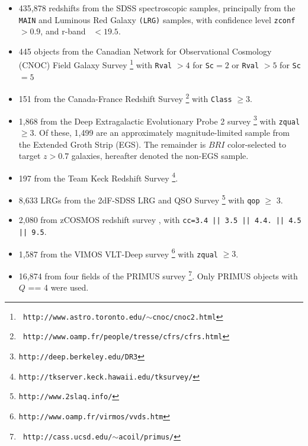 \documentclass[preprint]{aastex}
\begin{document}
\begin{itemize} 

    \item 435,878 redshifts from the SDSS spectroscopic samples,
principally from the \texttt{MAIN} and Luminous Red Galaxy \texttt{(LRG)}
samples, with confidence level \texttt{zconf}$ > 0.9$, and r-band
\cmodelmag\ $ <19.5$.


    \item 445 objects from the Canadian Network for Observational
Cosmology (CNOC) Field Galaxy Survey \cite[CNOC2;][]{yee00}\footnote{\tt
http://www.astro.toronto.edu/$\sim$cnoc/cnoc2.html} with \texttt{Rval} $>4$
for \texttt{Sc}$=2$ or \texttt{Rval} $> 5$ for \texttt{Sc}$=5$

    \item 151 from the Canada-France Redshift
Survey \cite[CFRS;][]{lilly95}\footnote{\tt
http://www.oamp.fr/people/tresse/cfrs/cfrs.html} with \texttt{Class} $\geq 3$.

    \item 1,868 from the Deep Extragalactic Evolutionary Probe 2 survey
\citep[DEEP2;][]{weiner05}\footnote{\tt http://deep.berkeley.edu/DR3}
with \texttt{zqual} $\geq 3$. 
Of these, 1,499 are an approximately magnitude-limited sample from the Extended Groth Strip (EGS).
The remainder is $BRI$ color-selected to target $z>0.7$ galaxies, hereafter denoted the non-EGS sample. 

    \item 197 from the Team Keck Redshift Survey \cite[TKRS;][]{wirth04}\footnote{\tt http://tkserver.keck.hawaii.edu/tksurvey/}.

    \item 8,633 LRGs from the 2dF-SDSS LRG and QSO Survey \cite[2SLAQ;][]{cannon06}\footnote{\tt http://www.2slaq.info/} with \texttt{qop} $\geq$ 3.

    \item  2,080 from zCOSMOS redshift survey \cite{lilly07}, with  \texttt{cc=3.4 || 3.5 || 4.4.  || 4.5 || 9.5}.
    
    \item 1,587 from the VIMOS VLT-Deep survey \cite[VVDS;][]{garilli08}\footnote{\tt http://www.oamp.fr/virmos/vvds.htm} with \texttt{zqual} $\geq 3$.

    \item 16,874 from four fields of the PRIMUS survey
    \cite[PRIMUS;][]{coil10,cool12}\footnote{\tt
    http://cass.ucsd.edu/$\sim$acoil/primus/}.  Only PRIMUS objects with $Q$ ==
    4 were used.      \end{itemize}
\end{document}

